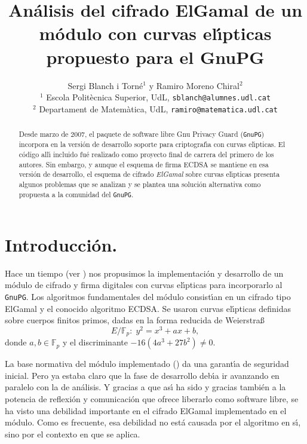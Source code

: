 \documentclass{cedi}%
\def\ces{curvas{} el\'{\i}pticas}%
\newcommand{\Fp}{\ensuremath{\mathbb{F}_p}}%
\theoremstyle{plain}        			%
\theoremstyle{definition}   			%
\theoremstyle{saltolinea}   			%
\def\inst#1{\unskip$^{#1}$}
\def\email#1{{\tt#1}}
\begin{document}
\title{An\'alisis del cifrado ElGamal de un m\'odulo con \ces{} propuesto para el GnuPG}

\author{Sergi Blanch i Torn\'e\inst{1} y Ramiro Moreno Chiral\inst{2}\\ $^1$ Escola Polit\`ecnica Superior, UdL, \email{sblanch@alumnes.udl.cat}\\ $^2$ Departament de Matem\`atica, UdL, \email{ramiro@matematica.udl.cat}}
\date{}

\maketitle
\thispagestyle{empty}

\begin{abstract}
Desde marzo de 2007, el paquete de software libre Gnu Privacy Guard (\texttt{GnuPG}) incorpora en la versi\'on de desarrollo soporte para criptograf\'{\i}a con \ces{}. El c\'odigo all\'{\i} incluido fu\'e realizado como proyecto final de carrera del primero de los autores. Sin embargo, y aunque el esquema de firma ECDSA se mantiene en esa versi\'on de desarrollo, el esquema de cifrado \emph{ElGamal} sobre \ces{} presenta algunos problemas que se analizan y se plantea una soluci\'on alternativa como propuesta a la comunidad del \texttt{GnuPG}.
\end{abstract}

\section{Introducci\'on.} 
Hace un tiempo (ver \cite{bm:proyecto,bm:gnupgces}) nos propusimos la implementaci\'on y desarrollo de un m\'odulo de cifrado y firma digitales con \ces{} para incorporarlo al \texttt{GnuPG}. Los algoritmos fundamentales del m\'odulo consist\'{\i}an en un cifrado tipo ElGamal y el conocido algoritmo ECDSA. Se usaron \ces{} definidas sobre cuerpos finitos primos, dadas en la forma reducida de Weierstra\ss{}
\begin{equation}\label{eq:WRF} E/\Fp:\; y^2=x^3+ax+b,\end{equation}
donde $a,b\in\Fp$ y el discriminante $-16(4a^3+27b^2)\ne 0$.

La base normativa del m\'odulo implementado (\cite{P1363,NIST}) da una garant\'{\i}a de seguridad inicial. Pero ya estaba claro que la fase de desarrollo deb\'{\i}a ir avanzando en paralelo con la de an\'alisis. Y gracias a que as\'{\i} ha sido y gracias tambi\'en a la potencia de reflexi\'on y comunicaci\'on que ofrece liberarlo como software libre, se ha visto una debilidad importante en el cifrado ElGamal implementado en el m\'odulo. Como es frecuente, esa debilidad no est\'a causada por el algoritmo en s\'{\i}, sino por el contexto en que se aplica.
\end{document}
